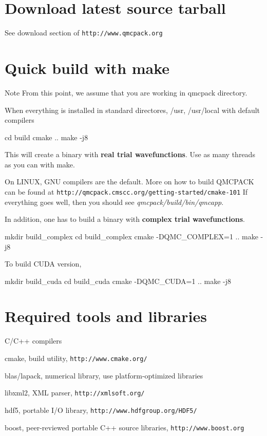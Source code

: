\section{Download latest source tarball}\label{a00002_download}
See download section of {\tt http\-://www.\-qmcpack.\-org}\section{Quick build with make}\label{a00002_quicky}
\begin{DoxyNote}{Note}
From this point, we assume that you are working in qmcpack directory.
\end{DoxyNote}
When everything is installed in standard directores, {\ttfamily /usr}, {\ttfamily /usr/local} with default compilers 
\begin{DoxyCode}
cd build
cmake ..
make -j8
\end{DoxyCode}
 This will create a binary with {\bfseries real trial wavefunctions}. Use as many threads as you can with {\ttfamily make}.

On L\-I\-N\-U\-X, G\-N\-U compilers are the default. More on how to build Q\-M\-C\-P\-A\-C\-K can be found at {\tt http\-://qmcpack.\-cmscc.\-org/getting-\/started/cmake-\/101} If everything goes well, then you should see {\itshape qmcpack/build/bin/qmcapp}.

In addition, one has to build a binary with {\bfseries complex trial wavefunctions}. 
\begin{DoxyCode}
mkdir build\_complex
cd build\_complex
cmake -DQMC\_COMPLEX=1 ..
make -j8
\end{DoxyCode}


To build C\-U\-D\-A version, 
\begin{DoxyCode}
mkdir build\_cuda
cd build\_cuda
cmake -DQMC\_CUDA=1 ..
make -j8
\end{DoxyCode}
\section{Required tools and libraries}\label{a00002_pre_sec}

\begin{DoxyItemize}
\item C/\-C++ compilers
\item cmake, build utility, {\tt http\-://www.\-cmake.\-org/}
\item blas/lapack, numerical library, use platform-\/optimized libraries
\item libxml2, X\-M\-L parser, {\tt http\-://xmlsoft.\-org/}
\item hdf5, portable I/\-O library, {\tt http\-://www.\-hdfgroup.\-org/\-H\-D\-F5/}
\item boost, peer-\/reviewed portable C++ source libraries, {\tt http\-://www.\-boost.\-org}
\end{DoxyItemize}

